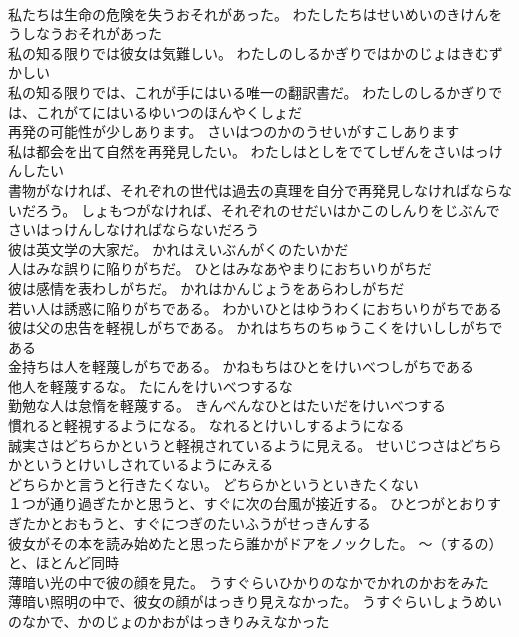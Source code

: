 \documentclass[8pt]{extreport}
\begin{document}
\begin{CJK}{UTF8}{min}
\\	私たちは生命の危険を失うおそれがあった。	わたしたちはせいめいのきけんをうしなうおそれがあった 
\\	私の知る限りでは彼女は気難しい。	わたしのしるかぎりではかのじょはきむずかしい 
\\	私の知る限りでは、これが手にはいる唯一の翻訳書だ。	わたしのしるかぎりでは、これがてにはいるゆいつのほんやくしょだ 
\\	再発の可能性が少しあります。	さいはつのかのうせいがすこしあります 
\\	私は都会を出て自然を再発見したい。	わたしはとしをでてしぜんをさいはっけんしたい 
\\	書物がなければ、それぞれの世代は過去の真理を自分で再発見しなければならないだろう。	しょもつがなければ、それぞれのせだいはかこのしんりをじぶんでさいはっけんしなければならないだろう 
\\	彼は英文学の大家だ。	かれはえいぶんがくのたいかだ 
\\	人はみな誤りに陥りがちだ。	ひとはみなあやまりにおちいりがちだ 
\\	彼は感情を表わしがちだ。	かれはかんじょうをあらわしがちだ 
\\	若い人は誘惑に陥りがちである。	わかいひとはゆうわくにおちいりがちである 
\\	彼は父の忠告を軽視しがちである。	かれはちちのちゅうこくをけいししがちである 
\\	金持ちは人を軽蔑しがちである。	かねもちはひとをけいべつしがちである 
\\	他人を軽蔑するな。	たにんをけいべつするな 
\\	勤勉な人は怠惰を軽蔑する。	きんべんなひとはたいだをけいべつする 
\\	慣れると軽視するようになる。	なれるとけいしするようになる 
\\	誠実さはどちらかというと軽視されているように見える。	せいじつさはどちらかというとけいしされているようにみえる 
\\	どちらかと言うと行きたくない。	どちらかというといきたくない 
\\	１つが通り過ぎたかと思うと、すぐに次の台風が接近する。	ひとつがとおりすぎたかとおもうと、すぐにつぎのたいふうがせっきんする 
\\	彼女がその本を読み始めたと思ったら誰かがドアをノックした。	～（するの）と、ほとんど同時
\\	薄暗い光の中で彼の顔を見た。	うすぐらいひかりのなかでかれのかおをみた 
\\	薄暗い照明の中で、彼女の顔がはっきり見えなかった。	うすぐらいしょうめいのなかで、かのじょのかおがはっきりみえなかった 

\end{CJK}
\end{document}
